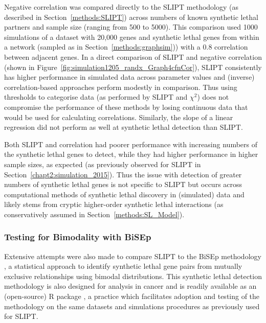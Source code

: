     
Negative correlation was compared directly to the \gls{SLIPT} methodology (as described in Section~\ref{methods:SLIPT}) across numbers of known \gls{synthetic lethal} partners and sample size (ranging from 500 to 5000). This comparison used 1000 simulations of a dataset with 20,000 genes and \gls{synthetic lethal} genes from within a network (sampled as in Section~\ref{methods:graphsim})) with a 0.8 correlation between adjacent genes. In a direct comparison of \gls{SLIPT} and negative correlation (shown in Figure~\ref{fig:simulation1205_randx_Graph4cfnCor}), \gls{SLIPT} consistently has higher performance in simulated data across parameter values and (inverse) correlation-based approaches perform modestly in comparison. Thus using thresholds to categorise  data (as performed by \gls{SLIPT} and $\chi^2$) does not compromise the performance of these methods by losing continuous data that would be used for calculating correlations. Similarly, the slope of a linear regression did not perform as well at \gls{synthetic lethal} detection than \gls{SLIPT}.


Both \gls{SLIPT} and correlation had poorer performance with increasing numbers of the \gls{synthetic lethal} genes to detect, while they had higher performance in higher sample sizes, as expected (as previously observed for \gls{SLIPT} in Section~\ref{chapt2:simulation_2015}). Thus the issue with detection of greater numbers of \gls{synthetic lethal} genes is not specific to \gls{SLIPT} but occurs across computational methods of \gls{synthetic lethal} discovery in (simulated)  data and likely stems from cryptic higher-order \gls{synthetic lethal} interactions (as conservatively assumed in Section~\ref{methods:SL_Model}). 
    
\FloatBarrier

\subsubsection{Testing for Bimodality with BiSEp}
\label{chapt5:compare_bisep}

Extensive attempts were also made to compare \gls{SLIPT} to the \gls{BiSEp} methodology \citep{Wappett2016}, a statistical approach to identify \gls{synthetic lethal} gene pairs from mutually exclusive relationships using bimodal distributions. This \gls{synthetic lethal} detection methodology is also designed for  analysis in cancer and is readily available as an (open-source) R package \citep{Wappett2014}, a practice which facilitates adoption and testing of the methodology on the same datasets and simulations procedures as previously used for \gls{SLIPT}.

